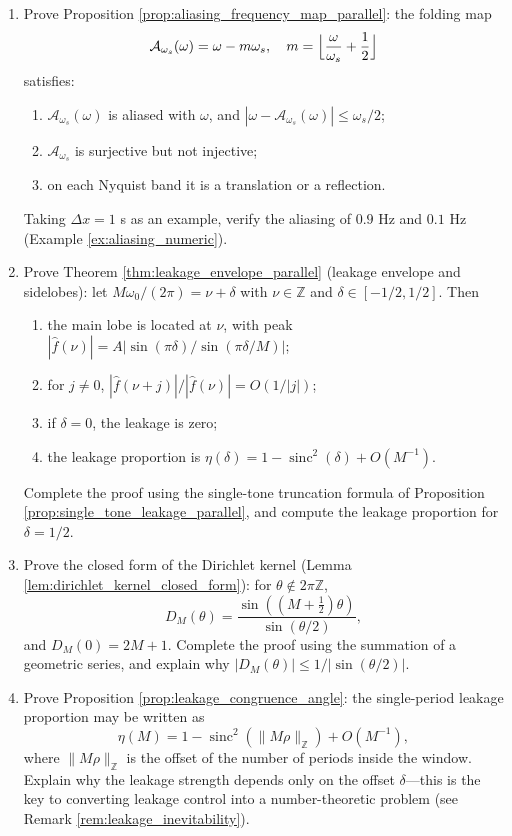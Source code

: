 \begin{enumerate}[leftmargin=3em, label=\textbf{Exercise \arabic*}]
    \item Prove Proposition \ref{prop:aliasing_frequency_map_parallel}:
    the folding map
    \[
    \mathcal{A}_{\omega_s}(\omega)=\omega-m\omega_s,\quad
    m=\Bigl\lfloor\frac{\omega}{\omega_s}+\frac12\Bigr\rfloor
    \]
    satisfies:
    \begin{enumerate}[label=(\roman*)]
        \item $\mathcal{A}_{\omega_s}(\omega)$ is aliased with $\omega$, and
              $|\omega-\mathcal{A}_{\omega_s}(\omega)|\le\omega_s/2$;
        \item $\mathcal{A}_{\omega_s}$ is surjective but not injective;
        \item on each Nyquist band it is a translation or a reflection.
    \end{enumerate}
    Taking $\Delta x=1$ s as an example, verify the aliasing of $0.9$ Hz and $0.1$ Hz (Example \ref{ex:aliasing_numeric}).

    \item Prove Theorem \ref{thm:leakage_envelope_parallel} (leakage envelope and sidelobes):
    let $M\omega_0/(2\pi)=\nu+\delta$ with $\nu\in\mathbb{Z}$ and $\delta\in[-1/2,1/2]$. Then
    \begin{enumerate}[label=(\roman*)]
        \item the main lobe is located at $\nu$, with peak
              $|\hat{f}(\nu)|=A|\sin(\pi\delta)/\sin(\pi\delta/M)|$;
        \item for $j\ne0$, $|\hat{f}(\nu+j)|/|\hat{f}(\nu)|=O(1/|j|)$;
        \item if $\delta=0$, the leakage is zero;
        \item the leakage proportion is $\eta(\delta)=1-\operatorname{sinc}^2(\delta)+O(M^{-1})$.
    \end{enumerate}
    Complete the proof using the single-tone truncation formula of Proposition \ref{prop:single_tone_leakage_parallel},
    and compute the leakage proportion for $\delta=1/2$.

    \item Prove the closed form of the Dirichlet kernel (Lemma \ref{lem:dirichlet_kernel_closed_form}):
    for $\theta\notin2\pi\mathbb{Z}$,
    \[
    D_M(\theta)=\frac{\sin((M+\frac12)\theta)}{\sin(\theta/2)},
    \]
    and $D_M(0)=2M+1$. Complete the proof using the summation of a geometric series,
    and explain why $|D_M(\theta)|\le1/|\sin(\theta/2)|$.

    \item Prove Proposition \ref{prop:leakage_congruence_angle}:
    the single-period leakage proportion may be written as
    \[
    \eta(M)=1-\operatorname{sinc}^2(\|M\rho\|_{\mathbb{Z}})+O(M^{-1}),
    \]
    where $\|M\rho\|_{\mathbb{Z}}$ is the offset of the number of periods inside the window.
    Explain why the leakage strength depends only on the offset $\delta$---this is the key to converting leakage control into a number-theoretic problem
    (see Remark \ref{rem:leakage_inevitability}).


\end{enumerate}

